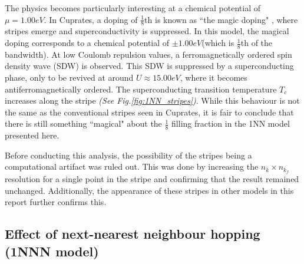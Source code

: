 \documentclass[11pt]{article}
\begin{document}
\noindent The physics becomes particularly interesting at a chemical potential of $\mu =1.00eV$. 
In Cuprates, a doping of $\frac{1}{8}$th is known as ``the magic doping" \cite{komiya2005magic}, where
stripes emerge and superconductivity is suppressed. In this model, the magical doping corresponds 
to a chemical potential of $\pm 1.00eV$(which is $\frac{1}{8}$th of the bandwidth). 
At low Coulomb repulsion values, a ferromagnetically ordered spin density wave (SDW) is observed. This SDW is suppressed by a superconducting phase,
only to be revived at around $U \approx 15.00eV$, where it becomes antiferromagnetically ordered. The superconducting transition temperature $T_c$ increases along the stripe \textit{(See Fig.\ref{fig:1NN_stripes})}.
While this behaviour is not the same as the conventional stripes seen in Cuprates, it is fair to conclude that there is still something 
``magical" about the $\frac{1}{8}$ filling fraction in the 1NN model presented here. \par
\medskip

\noindent Before conducting this analysis, the possibility of the stripes being a computational artifact was ruled out.
This was done by increasing the $n_k \times n_{k_f}$ resolution for a single point in the stripe and
confirming that the result remained unchanged. Additionally, the appearance of these stripes in other models in this report further confirms this.


\subsection{Effect of next-nearest neighbour hopping (1NNN model)}
\label{subsec:1NNNModel}
\end{document}
